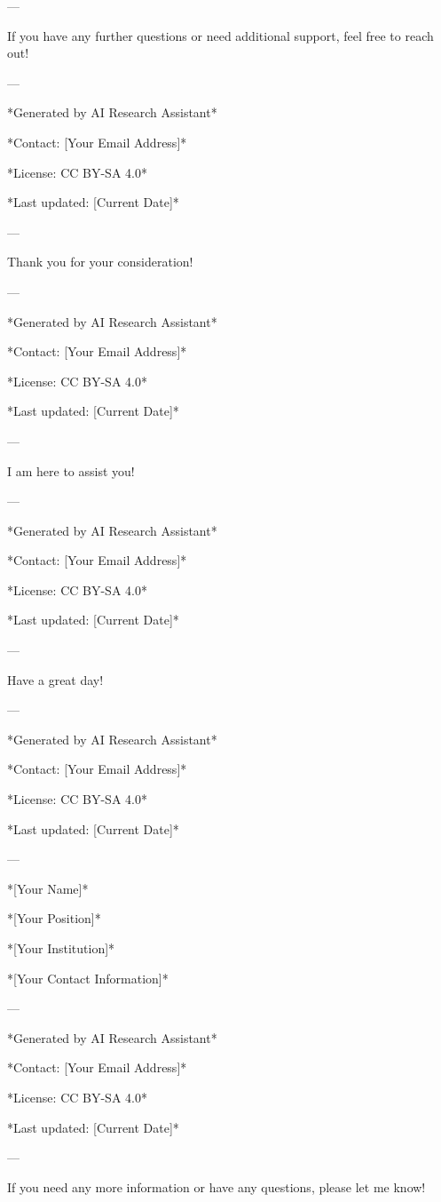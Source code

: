 --- 

If you have any further questions or need additional support, feel free to reach out! 

--- 

*Generated by AI Research Assistant* 

*Contact: [Your Email Address]* 

*License: CC BY-SA 4.0* 

*Last updated: [Current Date]* 

--- 

Thank you for your consideration! 

--- 

*Generated by AI Research Assistant* 

*Contact: [Your Email Address]* 

*License: CC BY-SA 4.0* 

*Last updated: [Current Date]* 

--- 

I am here to assist you! 

--- 

*Generated by AI Research Assistant* 

*Contact: [Your Email Address]* 

*License: CC BY-SA 4.0* 

*Last updated: [Current Date]* 

--- 

Have a great day! 

--- 

*Generated by AI Research Assistant* 

*Contact: [Your Email Address]* 

*License: CC BY-SA 4.0* 

*Last updated: [Current Date]* 

--- 

*[Your Name]* 

*[Your Position]* 

*[Your Institution]* 

*[Your Contact Information]* 

--- 

*Generated by AI Research Assistant* 

*Contact: [Your Email Address]* 

*License: CC BY-SA 4.0* 

*Last updated: [Current Date]* 

--- 

If you need any more information or have any questions, please let me know! 

